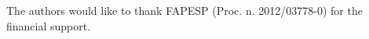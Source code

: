 \documentclass[journal]{IEEEtran}
\begin{document}
The authors would like to thank FAPESP (Proc. n. 2012/03778-0) for the financial support.


\ifCLASSOPTIONcaptionsoff
  \newpage
\fi


%
%

\end{document}
